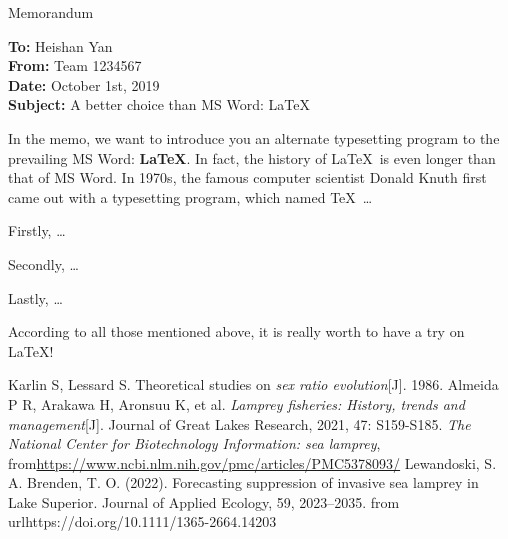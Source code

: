 \documentclass[12pt]{article}  %
\begin{document}
\begin{letter}{Memorandum}
\begin{flushleft}  %
\textbf{To:} Heishan Yan\\
\textbf{From:} Team 1234567\\
\textbf{Date:} October 1st, 2019\\
\textbf{Subject:} A better choice than MS Word: \LaTeX
\end{flushleft}

In the memo, we want to introduce you an alternate typesetting program to the prevailing MS Word: \textbf{\LaTeX}. In fact, the history of \LaTeX\ is even longer than that of MS Word. In 1970s, the famous computer scientist Donald Knuth first came out with a typesetting program, which named \TeX\ \ldots

Firstly, \ldots

Secondly, \ldots

Lastly, \ldots

According to all those mentioned above, it is really worth to have a try on \LaTeX! 
\end{letter}
\newpage

\begin{thebibliography}{99}
 Karlin S, Lessard S. Theoretical studies on \emph{sex ratio evolution}[J]. 1986.
 Almeida P R, Arakawa H, Aronsuu K, et al. \emph{Lamprey fisheries: History, trends and management}[J]. Journal of Great Lakes Research, 2021, 47: S159-S185.
 \emph{The National Center for Biotechnology Information: sea lamprey}, from\url{https://www.ncbi.nlm.nih.gov/pmc/articles/PMC5378093/}
 Lewandoski, S. A. Brenden, T. O. (2022). Forecasting suppression of invasive sea lamprey in Lake Superior. Journal of Applied Ecology, 59, 2023–2035. from url{https://doi.org/10.1111/1365-2664.14203}
\end{thebibliography}
\end{document}
